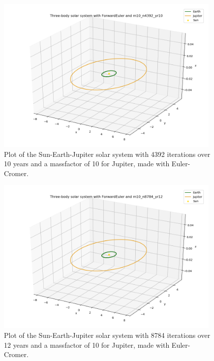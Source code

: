 \documentclass{article}
\begin{document}
    \begin{figure}[H]
        \centering
        \includegraphics[width = 11cm]{img/plot3D_S_E_J_F_m10_n4392_yr10.png}
        \caption{Plot of the Sun-Earth-Jupiter solar system with 4392 iterations over 10 years and a massfactor of 10 for Jupiter, made with Euler-Cromer.}
        \label{fig:plot3D_S_E_J_F_m10_n4392_yr10}
    \end{figure}

    \begin{figure}[H]
        \centering
        \includegraphics[width = 11cm]{img/plot3D_S_E_J_F_m10_n8784_yr12.png}
        \caption{Plot of the Sun-Earth-Jupiter solar system with 8784 iterations over 12 years and a massfactor of 10 for Jupiter, made with Euler-Cromer.}
        \label{fig:plot3D_S_E_J_F_m10_n8784_yr12}
    \end{figure}
\end{document}
